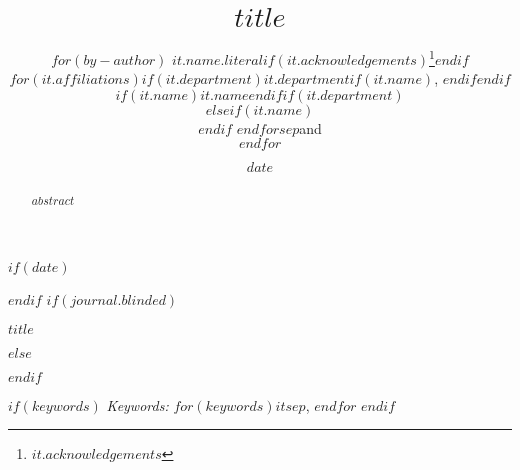 

\def\spacingset#1{\renewcommand{\baselinestretch}%
{#1}\small\normalsize} \spacingset{1}



$if(date)$
\date{$date$}
$endif$
$if(journal.blinded)$
\spacingset{.8}
\bigskip
\bigskip
\bigskip
\begin{center}
  {\LARGE\bf $title$}
\end{center}
\smallskip
\bigskip
\spacingset{1}
$else$
\title{\bf $title$}
\author{
$for(by-author)$
$it.name.literal$$if(it.acknowledgements)$\thanks{$it.acknowledgements$}$endif$\\
$for(it.affiliations)$$if(it.department)$$it.department$$if(it.name)$, $endif$$endif$$if(it.name)$$it.name$$endif$$if(it.department)$\\$elseif(it.name)$\\$endif$
$endfor$$sep$and\\$endfor$}
\maketitle
$endif$

\bigskip
\bigskip
\begin{abstract}
$abstract$
\end{abstract}

$if(keywords)$
\noindent%
{\it Keywords:} $for(keywords)$$it$$sep$, $endfor$
\vfill
$endif$

\newpage
\spacingset{1} %

